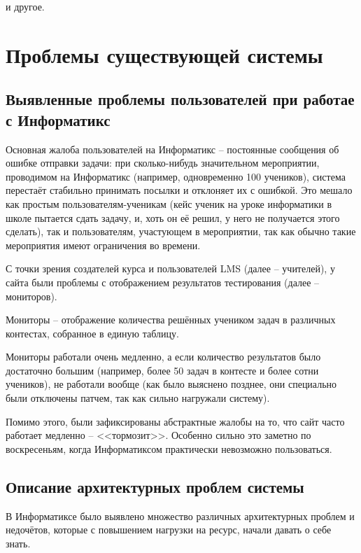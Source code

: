 и другое.

\section{Проблемы существующей системы}

\subsection{Выявленные проблемы пользователей при работае с Информатикс}

Основная жалоба пользователей на Информатикс -- постоянные сообщения об ошибке отправки задачи:
при сколько-нибудь значительном мероприятии, проводимом на Информатикс (например, одновременно 100 учеников), система перестаёт стабильно принимать посылки и отклоняет их с ошибкой\cite{inf_not_working}. 
Это мешало как простым пользователям-ученикам 
(кейс ученик на уроке информатики в школе пытается сдать задачу, и, хоть он её решил, у него не получается этого сделать), 
так и пользователям, участующем в мероприятии, так как обычно такие мероприятия имеют ограничения во времени.

С точки зрения создателей курса и пользователей LMS (далее -- учителей),
у сайта были проблемы с отображением результатов тестирования (далее -- мониторов).

Мониторы -- отображение количества решённых учеником задач в различных контестах, собранное в единую таблицу.

Мониторы работали очень медленно, а если количество результатов было достаточно большим 
(например, более 50 задач в контесте и более сотни учеников), 
не работали вообще (как было выяснено позднее, они специально были отключены патчем, так как сильно нагружали систему).

Помимо этого, были зафиксированы абстрактные жалобы на то, что сайт часто работает медленно -- <<тормозит>>. 
Особенно сильно это заметно по воскресеньям, когда Информатиксом практически невозможно пользоваться.

\subsection{Описание архитектурных проблем системы}

В Информатиксе было выявлено множество различных архитектурных проблем и недочётов, 
которые с повышением нагрузки на ресурс, начали давать о себе знать.

